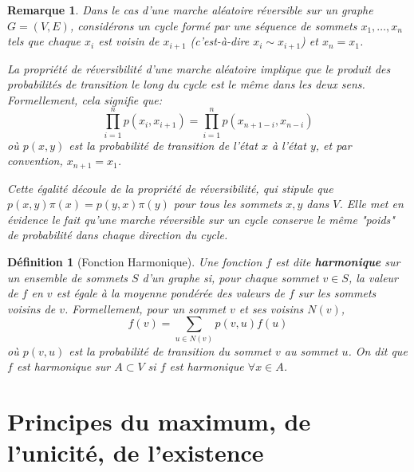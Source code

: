\documentclass{article}
\theoremstyle{pasdepoint}
\newtheorem{definition}{Définition}
\theoremstyle{break}
\theoremstyle{pasdepoint}
\newtheorem*{remark}{Remarque}
\begin{document}
\begin{remark}
    Dans le cas d'une marche aléatoire réversible sur un graphe \( G = (V, E) \), considérons un cycle formé par une séquence de sommets \( x_1, \ldots, x_n \) tels que chaque \( x_i \) est voisin de \( x_{i+1} \) (c'est-à-dire \( x_i \sim x_{i+1} \)) et \( x_n = x_1 \). 

    La propriété de réversibilité d'une marche aléatoire implique que le produit des probabilités de transition le long du cycle est le même dans les deux sens. Formellement, cela signifie que:
    \[
    \prod_{i=1}^{n}p(x_i, x_{i+1}) = \prod_{i=1}^{n}p(x_{n+1-i}, x_{n-i})
    \]
    où \( p(x, y) \) est la probabilité de transition de l'état \( x \) à l'état \( y \), et par convention, \( x_{n+1} = x_1 \).

    Cette égalité découle de la propriété de réversibilité, qui stipule que \( p(x, y)\pi(x) = p(y, x)\pi(y) \) pour tous les sommets \( x, y \) dans \( V \). Elle met en évidence le fait qu'une marche réversible sur un cycle conserve le même "poids" de probabilité dans chaque direction du cycle.
\end{remark}

\begin{definition}[Fonction Harmonique]
    Une fonction \(f\) est dite \textbf{harmonique} sur un ensemble de sommets \(S\) d'un graphe si, pour chaque sommet \(v \in S\), la valeur de \(f\) en \(v\) est égale à la moyenne pondérée des valeurs de \(f\) sur les sommets voisins de \(v\). Formellement, pour un sommet \(v\) et ses voisins \(N(v)\),
    \[
    f(v) = \sum_{u \in N(v)} p(v, u) f(u)
    \]
    où \(p(v, u)\) est la probabilité de transition du sommet \(v\) au sommet \(u\). On dit que \(f\) est harmonique sur \(A \subset V\) si \(f\) est harmonique \(\forall x \in A\).
\end{definition}

\section*{Principes du maximum, de l'unicité, de l'existence}
\end{document}
